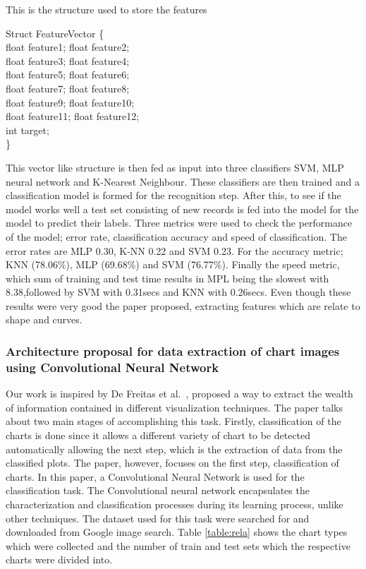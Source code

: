 \documentclass[12pt, a4paper,oneside]{report}
\begin{document}
\begin{algorithm}
\caption{This is the structure used to store the features}
\label{alg:1}
Struct FeatureVector \{\\
	float feature1; float feature2;\\
	float feature3; float feature4;\\
	float feature5; float feature6;\\
	float feature7; float feature8;\\
	float feature9; float feature10;\\
	float feature11; float feature12;\\
	int target;\\
\}
\end{algorithm}


This vector like structure is then fed as input into three classifiers SVM, MLP neural network and K-Nearest Neighbour. These classifiers are then trained and a classification model is formed for the recognition step. After this, to see if the model works well a test set consisting of new records is fed into the model for the model to predict their labels. Three metrics were used to check the performance of the model; error rate,
classification accuracy and speed of classification. The error rates are MLP 0.30, K-NN 0.22 and SVM 0.23. For the accuracy metric; KNN (78.06\%), MLP (69.68\%) and SVM (76.77\%). Finally the speed metric, which sum of training and test time results in MPL being the slowest with 8.38,followed by SVM with 0.31secs and  KNN with 0.26secs. Even though these results were very good the paper proposed, extracting features which are relate to shape and curves.

\subsubsection{Architecture proposal for data extraction of chart images using Convolutional Neural Network}
Our work is inspired by De Freitas et al.~\cite{junior2017archi}, proposed a way to extract the wealth of information contained in different visualization techniques. The paper talks about two main stages of accomplishing this task. Firstly, classification of the charts is done since it allows a different variety of chart to be detected automatically allowing the next step, which is the extraction of data from the classified plots. The paper, however, focuses on the first step, classification of charts. In this paper, a Convolutional Neural Network is used for the classification task. The Convolutional neural network encapsulates the characterization and classification processes during its learning process, unlike other techniques. The dataset used for this task were searched for and downloaded from Google image search. Table \ref{table:rela} shows the chart types which were collected and the number of train and test sets which the respective charts were divided into.
\end{document}
